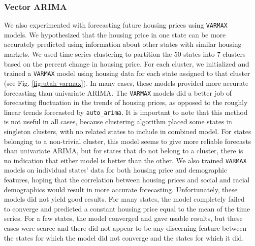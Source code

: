 \documentclass[11pt]{amsart}
\begin{document}

\subsubsection{Vector ARIMA}

We also experimented with forecasting future housing prices using \texttt{VARMAX} models.
We hypothesized that the housing price in one state can be more accurately predicted using information about other states with similar housing markets.
We used time series clustering to partition the 50 states into 7 clusters based on the percent change in housing price.
For each cluster, we initialized and trained a \texttt{VARMAX} model using housing data for each state assigned to that cluster (see Fig. \ref{fig:utah varmax}).
In many cases, these models provided more accurate forecasting than univariate ARIMA.
The \texttt{VARMAX} models did a better job of forecasting fluctuation in the trends of housing prices, as opposed to the roughly linear trends forecasted by \texttt{auto\_arima}.
It is important to note that this method is not useful in all cases, because clustering algorithm placed some states in singleton clusters, with no related states to include in combined model.
For states belonging to a non-trivial cluster, this model seems to give more reliable forecasts than univariate ARIMA, but for states that do not belong to a cluster, there is no indication that either model is better than the other.
We also trained \texttt{VARMAX} models on individual states' data for both housing price and demographic features, hoping that the correlation between housing prices and social and racial demographics would result in more accurate forecasting. Unfortunately, these models did not yield good results.
For many states, the model completely failed to converge and predicted a constant housing price equal to the mean of the time series.
For a few states, the model converged and gave usable results, but these cases were scarce and there did not appear to be any discerning feature between the states for which the model did not converge and the states for which it did.
\end{document}
